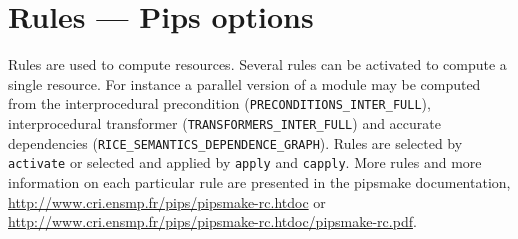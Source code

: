 \documentclass[a4paper,12pt]{article}
\newcommand{\PipsPIPSmakePDF}{\url{http://www.cri.ensmp.fr/pips/pipsmake-rc.htdoc/pipsmake-rc.pdf}\xspace}
\newcommand{\PipsPIPSmakeHTDOC}{\url{http://www.cri.ensmp.fr/pips/pipsmake-rc.htdoc}\xspace}
\begin{document}
\section{Rules --- Pips options}
\label{rules}

Rules are used to compute resources. Several rules can be activated to
compute a single resource. For instance a parallel version of a module may
be computed from the interprocedural precondition
(\verb+PRECONDITIONS_INTER_FULL+), interprocedural transformer
(\verb+TRANSFORMERS_INTER_FULL+) and accurate dependencies
(\verb+RICE_SEMANTICS_DEPENDENCE_GRAPH+). Rules are selected by
\verb+activate+ or selected and applied by \verb+apply+ and \verb+capply+.
More rules and more information on each particular rule are presented in
the pipsmake documentation, \PipsPIPSmakeHTDOC or \PipsPIPSmakePDF.
\end{document}
